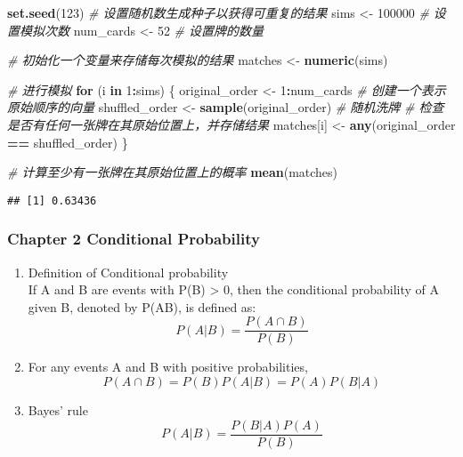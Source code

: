 \documentclass[
]{article}
\newenvironment{Shaded}{\begin{snugshade}}{\end{snugshade}}
\newcommand{\CommentTok}[1]{\textcolor[rgb]{0.56,0.35,0.01}{\textit{#1}}}
\newcommand{\ControlFlowTok}[1]{\textcolor[rgb]{0.13,0.29,0.53}{\textbf{#1}}}
\newcommand{\DecValTok}[1]{\textcolor[rgb]{0.00,0.00,0.81}{#1}}
\newcommand{\FunctionTok}[1]{\textcolor[rgb]{0.13,0.29,0.53}{\textbf{#1}}}
\newcommand{\NormalTok}[1]{#1}
\newcommand{\OtherTok}[1]{\textcolor[rgb]{0.56,0.35,0.01}{#1}}
\newcommand{\SpecialCharTok}[1]{\textcolor[rgb]{0.81,0.36,0.00}{\textbf{#1}}}
\begin{document}
\begin{Shaded}
\begin{Highlighting}[]
\FunctionTok{set.seed}\NormalTok{(}\DecValTok{123}\NormalTok{)  }\CommentTok{\# 设置随机数生成种子以获得可重复的结果}
\NormalTok{sims }\OtherTok{\textless{}{-}} \DecValTok{100000}  \CommentTok{\# 设置模拟次数}
\NormalTok{num\_cards }\OtherTok{\textless{}{-}} \DecValTok{52}  \CommentTok{\# 设置牌的数量}

\CommentTok{\# 初始化一个变量来存储每次模拟的结果}
\NormalTok{matches }\OtherTok{\textless{}{-}} \FunctionTok{numeric}\NormalTok{(sims)}

\CommentTok{\# 进行模拟}
\ControlFlowTok{for}\NormalTok{ (i }\ControlFlowTok{in} \DecValTok{1}\SpecialCharTok{:}\NormalTok{sims) \{}
\NormalTok{  original\_order }\OtherTok{\textless{}{-}} \DecValTok{1}\SpecialCharTok{:}\NormalTok{num\_cards  }\CommentTok{\# 创建一个表示原始顺序的向量}
\NormalTok{  shuffled\_order }\OtherTok{\textless{}{-}} \FunctionTok{sample}\NormalTok{(original\_order)  }\CommentTok{\# 随机洗牌}
  \CommentTok{\# 检查是否有任何一张牌在其原始位置上，并存储结果}
\NormalTok{  matches[i] }\OtherTok{\textless{}{-}} \FunctionTok{any}\NormalTok{(original\_order }\SpecialCharTok{==}\NormalTok{ shuffled\_order)}
\NormalTok{\}}

\CommentTok{\# 计算至少有一张牌在其原始位置上的概率}
\FunctionTok{mean}\NormalTok{(matches)}
\end{Highlighting}
\end{Shaded}

\begin{verbatim}
## [1] 0.63436
\end{verbatim}

\hypertarget{chapter-2-conditional-probability}{%
\subsubsection{Chapter 2 Conditional
Probability}\label{chapter-2-conditional-probability}}

\begin{enumerate}
\def\labelenumi{\arabic{enumi}.}
\item
  Definition of Conditional probability\\
  If A and B are events with P(B) \textgreater{} 0, then the conditional
  probability of A given B, denoted by P(A\textbar B), is deﬁned as:
  \[ P(A|B) = \frac{P(A \cap B)}{P(B)} \]
\item
  For any events A and B with positive probabilities,
  \[ P(A \cap B) = P(B)P(A|B) = P(A)P(B|A) \]
\item
  Bayes' rule \[ P(A|B) = \frac{P(B|A)P(A)}{P(B)} \]
\end{enumerate}
\end{document}
